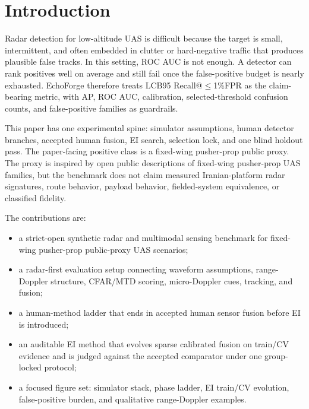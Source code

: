 \documentclass[10pt,journal]{IEEEtran}
\makeatletter
\newcommand{\PrimaryKPI}{LCB95 Recall@$\leq$1\%FPR}
\makeatother
\begin{document}
\section{Introduction}
Radar detection for low-altitude UAS is difficult because the target is small, intermittent, and often embedded in clutter or hard-negative traffic that produces plausible false tracks. In this setting, ROC AUC is not enough. A detector can rank positives well on average and still fail once the false-positive budget is nearly exhausted. EchoForge therefore treats \PrimaryKPI{} as the claim-bearing metric, with AP, ROC AUC, calibration, selected-threshold confusion counts, and false-positive families as guardrails.

This paper has one experimental spine: simulator assumptions, human detector branches, accepted human fusion, EI search, selection lock, and one blind holdout pass. The paper-facing positive class is a fixed-wing pusher-prop public proxy. The proxy is inspired by open public descriptions of fixed-wing pusher-prop UAS families, but the benchmark does not claim measured Iranian-platform radar signatures, route behavior, payload behavior, fielded-system equivalence, or classified fidelity.

The contributions are:
\begin{itemize}
  \item a strict-open synthetic radar and multimodal sensing benchmark for fixed-wing pusher-prop public-proxy UAS scenarios;
  \item a radar-first evaluation setup connecting waveform assumptions, range-Doppler structure, CFAR/MTD scoring, micro-Doppler cues, tracking, and fusion;
  \item a human-method ladder that ends in accepted human sensor fusion before EI is introduced;
  \item an auditable EI method that evolves sparse calibrated fusion on train/CV evidence and is judged against the accepted comparator under one group-locked protocol;
  \item a focused figure set: simulator stack, phase ladder, EI train/CV evolution, false-positive burden, and qualitative range-Doppler examples.
\end{itemize}
\end{document}
